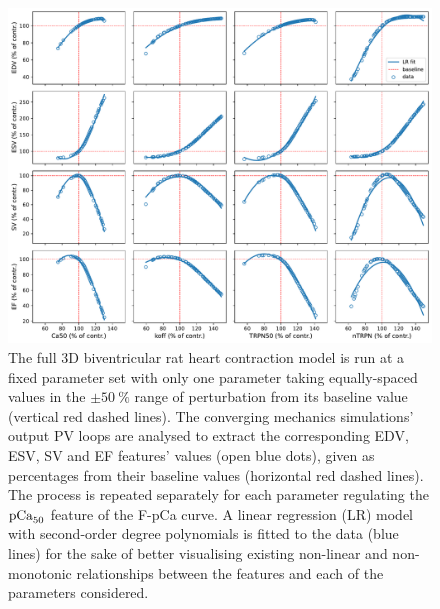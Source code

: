 \begin{figure}[h!]
    \myfloatalign
    \includegraphics[width=\textwidth]{figures/chapter08/Fig1.pdf}
    \caption{The full $3$D biventricular rat heart contraction model is run at a fixed parameter set with only one parameter taking equally-spaced values in the $\pm\SI{50}{\percent}$ range of perturbation from its baseline value (vertical red dashed lines). The converging mechanics simulations' output PV loops are analysed to extract the corresponding EDV, ESV, SV and EF features' values (open blue dots), given as percentages from their baseline values (horizontal red dashed lines). The process is repeated separately for each parameter regulating the $\textrm{pCa}_{50}$ feature of the F-pCa curve. A linear regression (LR) model with second-order degree polynomials is fitted to the data (blue lines) for the sake of better visualising existing non-linear and non-monotonic relationships between the features and each of the parameters considered.}
    \label{fig:EFvsparamsnonmonotonic}
\end{figure}

